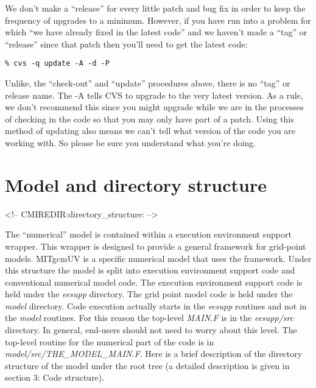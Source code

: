 We don't make a ``release'' for every little patch and bug fix in
order to keep the frequency of upgrades to a minimum. However, if you
have run into a problem for which ``we have already fixed in the
latest code'' and we haven't made a ``tag'' or ``release'' since that
patch then you'll need to get the latest code:
\begin{verbatim}
% cvs -q update -A -d -P
\end{verbatim}
Unlike, the ``check-out'' and ``update'' procedures above, there is no
``tag'' or release name. The -A tells CVS to upgrade to the
very latest version. As a rule, we don't recommend this since you
might upgrade while we are in the processes of checking in the code so
that you may only have part of a patch. Using this method of updating
also means we can't tell what version of the code you are working
with. So please be sure you understand what you're doing.

\section{Model and directory structure}
\begin{rawhtml}
<!-- CMIREDIR:directory_structure: -->
\end{rawhtml}

The ``numerical'' model is contained within a execution environment
support wrapper. This wrapper is designed to provide a general
framework for grid-point models. MITgcmUV is a specific numerical
model that uses the framework. Under this structure the model is split
into execution environment support code and conventional numerical
model code. The execution environment support code is held under the
\textit{eesupp} directory. The grid point model code is held under the
\textit{model} directory. Code execution actually starts in the
\textit{eesupp} routines and not in the \textit{model} routines. For
this reason the top-level \textit{MAIN.F} is in the
\textit{eesupp/src} directory. In general, end-users should not need
to worry about this level. The top-level routine for the numerical
part of the code is in \textit{model/src/THE\_MODEL\_MAIN.F}. Here is
a brief description of the directory structure of the model under the
root tree (a detailed description is given in section 3: Code
structure).


